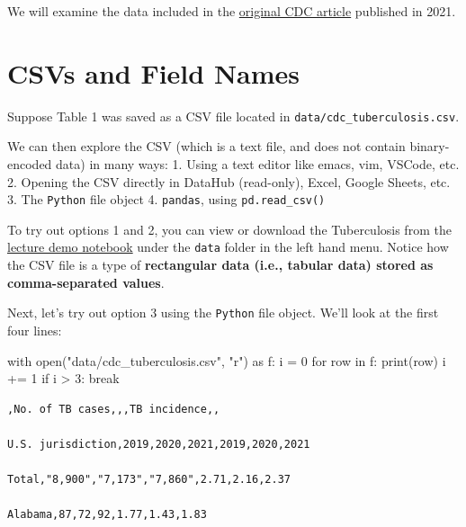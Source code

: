 \documentclass[
  letterpaper,
  DIV=11,
  numbers=noendperiod]{scrreprt}
\newenvironment{Shaded}{\begin{snugshade}}{\end{snugshade}}
\newcommand{\BuiltInTok}[1]{\textcolor[rgb]{0.00,0.23,0.31}{#1}}
\newcommand{\ControlFlowTok}[1]{\textcolor[rgb]{0.00,0.23,0.31}{#1}}
\newcommand{\DecValTok}[1]{\textcolor[rgb]{0.68,0.00,0.00}{#1}}
\newcommand{\ImportTok}[1]{\textcolor[rgb]{0.00,0.46,0.62}{#1}}
\newcommand{\KeywordTok}[1]{\textcolor[rgb]{0.00,0.23,0.31}{#1}}
\newcommand{\NormalTok}[1]{\textcolor[rgb]{0.00,0.23,0.31}{#1}}
\newcommand{\OperatorTok}[1]{\textcolor[rgb]{0.37,0.37,0.37}{#1}}
\newcommand{\StringTok}[1]{\textcolor[rgb]{0.13,0.47,0.30}{#1}}
\begin{document}
We will examine the data included in the
\href{https://www.cdc.gov/mmwr/volumes/71/wr/mm7112a1.htm?s_cid=mm7112a1_w\#T1_down}{original
CDC article} published in 2021.

\hypertarget{csvs-and-field-names}{%
\section{CSVs and Field Names}\label{csvs-and-field-names}}

Suppose Table 1 was saved as a CSV file located in
\texttt{data/cdc\_tuberculosis.csv}.

We can then explore the CSV (which is a text file, and does not contain
binary-encoded data) in many ways: 1. Using a text editor like emacs,
vim, VSCode, etc. 2. Opening the CSV directly in DataHub (read-only),
Excel, Google Sheets, etc. 3. The \texttt{Python} file object 4.
\texttt{pandas}, using \texttt{pd.read\_csv()}

To try out options 1 and 2, you can view or download the Tuberculosis
from the
\href{https://data100.datahub.berkeley.edu/hub/user-redirect/git-pull?repo=https\%3A\%2F\%2Fgithub.com\%2FDS-100\%2Ffa23-student\&urlpath=lab\%2Ftree\%2Ffa23-student\%2Flecture\%2Flec05\%2Flec04-eda.ipynb\&branch=main}{lecture
demo notebook} under the \texttt{data} folder in the left hand menu.
Notice how the CSV file is a type of \textbf{rectangular data (i.e.,
tabular data) stored as comma-separated values}.

Next, let's try out option 3 using the \texttt{Python} file object.
We'll look at the first four lines:

\begin{Shaded}
\begin{Highlighting}[]
\ControlFlowTok{with} \BuiltInTok{open}\NormalTok{(}\StringTok{"data/cdc\_tuberculosis.csv"}\NormalTok{, }\StringTok{"r"}\NormalTok{) }\ImportTok{as}\NormalTok{ f:}
\NormalTok{    i }\OperatorTok{=} \DecValTok{0}
    \ControlFlowTok{for}\NormalTok{ row }\KeywordTok{in}\NormalTok{ f:}
        \BuiltInTok{print}\NormalTok{(row)}
\NormalTok{        i }\OperatorTok{+=} \DecValTok{1}
        \ControlFlowTok{if}\NormalTok{ i }\OperatorTok{\textgreater{}} \DecValTok{3}\NormalTok{:}
            \ControlFlowTok{break}
\end{Highlighting}
\end{Shaded}

\begin{verbatim}
,No. of TB cases,,,TB incidence,,

U.S. jurisdiction,2019,2020,2021,2019,2020,2021

Total,"8,900","7,173","7,860",2.71,2.16,2.37

Alabama,87,72,92,1.77,1.43,1.83
\end{verbatim}
\end{document}
